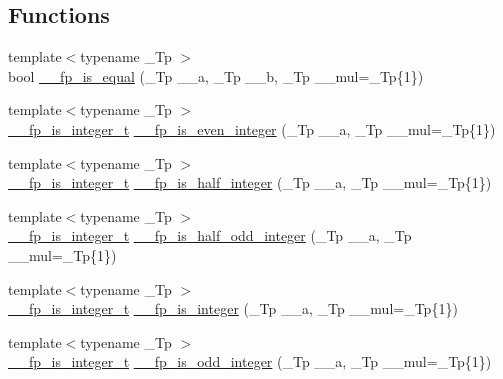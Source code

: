 \subsection*{Functions}
\begin{DoxyCompactItemize}
\item 
{\footnotesize template$<$typename \+\_\+\+Tp $>$ }\\bool \hyperlink{namespace____gnu__cxx_a586fa80a2f00ea60e6bed5e4f267bfd4}{\+\_\+\+\_\+fp\+\_\+is\+\_\+equal} (\+\_\+\+Tp \+\_\+\+\_\+a, \+\_\+\+Tp \+\_\+\+\_\+b, \+\_\+\+Tp \+\_\+\+\_\+mul=\+\_\+\+Tp\{1\})
\item 
{\footnotesize template$<$typename \+\_\+\+Tp $>$ }\\\hyperlink{struct____gnu__cxx_1_1____fp__is__integer__t}{\+\_\+\+\_\+fp\+\_\+is\+\_\+integer\+\_\+t} \hyperlink{namespace____gnu__cxx_aa78dac4c2812a060d30efa5a3c99977c}{\+\_\+\+\_\+fp\+\_\+is\+\_\+even\+\_\+integer} (\+\_\+\+Tp \+\_\+\+\_\+a, \+\_\+\+Tp \+\_\+\+\_\+mul=\+\_\+\+Tp\{1\})
\item 
{\footnotesize template$<$typename \+\_\+\+Tp $>$ }\\\hyperlink{struct____gnu__cxx_1_1____fp__is__integer__t}{\+\_\+\+\_\+fp\+\_\+is\+\_\+integer\+\_\+t} \hyperlink{namespace____gnu__cxx_a5b5e889240854b8a4452ac49593fdc74}{\+\_\+\+\_\+fp\+\_\+is\+\_\+half\+\_\+integer} (\+\_\+\+Tp \+\_\+\+\_\+a, \+\_\+\+Tp \+\_\+\+\_\+mul=\+\_\+\+Tp\{1\})
\item 
{\footnotesize template$<$typename \+\_\+\+Tp $>$ }\\\hyperlink{struct____gnu__cxx_1_1____fp__is__integer__t}{\+\_\+\+\_\+fp\+\_\+is\+\_\+integer\+\_\+t} \hyperlink{namespace____gnu__cxx_af4f5d1b815527e3d8587bdbbef9470e3}{\+\_\+\+\_\+fp\+\_\+is\+\_\+half\+\_\+odd\+\_\+integer} (\+\_\+\+Tp \+\_\+\+\_\+a, \+\_\+\+Tp \+\_\+\+\_\+mul=\+\_\+\+Tp\{1\})
\item 
{\footnotesize template$<$typename \+\_\+\+Tp $>$ }\\\hyperlink{struct____gnu__cxx_1_1____fp__is__integer__t}{\+\_\+\+\_\+fp\+\_\+is\+\_\+integer\+\_\+t} \hyperlink{namespace____gnu__cxx_a75c2c5ab6f25d41dddd3d00235593211}{\+\_\+\+\_\+fp\+\_\+is\+\_\+integer} (\+\_\+\+Tp \+\_\+\+\_\+a, \+\_\+\+Tp \+\_\+\+\_\+mul=\+\_\+\+Tp\{1\})
\item 
{\footnotesize template$<$typename \+\_\+\+Tp $>$ }\\\hyperlink{struct____gnu__cxx_1_1____fp__is__integer__t}{\+\_\+\+\_\+fp\+\_\+is\+\_\+integer\+\_\+t} \hyperlink{namespace____gnu__cxx_adfc2607bd5aebd90ba6af2d4d4365bef}{\+\_\+\+\_\+fp\+\_\+is\+\_\+odd\+\_\+integer} (\+\_\+\+Tp \+\_\+\+\_\+a, \+\_\+\+Tp \+\_\+\+\_\+mul=\+\_\+\+Tp\{1\})

\end{DoxyCompactItemize}
